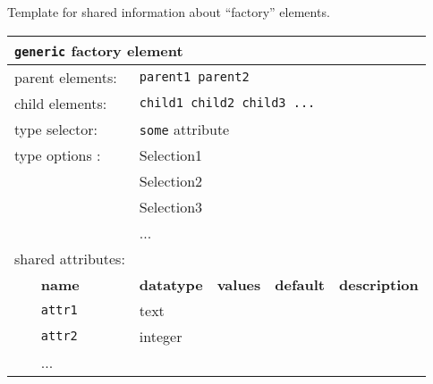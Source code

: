 Template for shared information about ``factory'' elements.
\FloatBarrier
\begin{table}[h]
\begin{center}
\begin{tabularx}{\textwidth}{l l l l l X }
\hline
\multicolumn{6}{l}{\texttt{generic} factory element} \\
\hline
\multicolumn{2}{l}{parent elements:} & \multicolumn{4}{l}{\texttt{parent1 parent2}}\\
\multicolumn{2}{l}{child  elements:} & \multicolumn{4}{l}{\texttt{child1 child2 child3 ...}}\\
\multicolumn{2}{l}{type   selector:} & \multicolumn{4}{l}{\texttt{some} attribute}\\
\multicolumn{2}{l}{type   options :} & \multicolumn{4}{l}{Selection1}\\
\multicolumn{2}{l}{                } & \multicolumn{4}{l}{Selection2}\\
\multicolumn{2}{l}{                } & \multicolumn{4}{l}{Selection3}\\
\multicolumn{2}{l}{                } & \multicolumn{4}{l}{...}\\
\multicolumn{2}{l}{shared attributes:} & \multicolumn{4}{l}{}\\
   &   \bfseries name     & \bfseries datatype & \bfseries values & \bfseries default   & \bfseries description \\
   &   \texttt{attr1}     &  text              &                  &                     &                       \\
   &   \texttt{attr2}     &  integer           &                  &                     &                       \\
   &   ...                &                    &                  &                     &                       \\
  \hline
\end{tabularx}
\end{center}
\end{table}
\FloatBarrier

